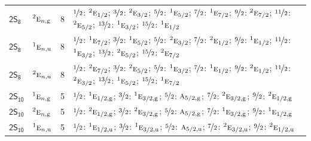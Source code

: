 \documentclass[10pt,a4paper]{article}
\numberwithin{equation}{section}
\newcommand{\grp}[1]{\mathsf{#1}}
\newcommand{\irr}[1]{\text{\normalfont\scshape #1}}
\newcommand{\conjpair}[1]{{}^{#1}}
\newcommand{\ptag}[1]{\mathrm{#1}}
\newlength{\fillwidth}\newlength{\cellwidth}\newlength{\colwidth}
\begin{document}
{\begin{longtable}{@{}llr>{\RaggedRight\arraybackslash}p{\fillwidth}@{}}
\href{2S8.pdf}{$\grp{2S_{8}}$} & $\conjpair{2}\irr{e}_{n,\ptag{g}}$ & 8 & $\nicefrac{1}{2}$: $\conjpair{2}\irr{e}_{1/2}$; $\nicefrac{3}{2}$: $\conjpair{2}\irr{e}_{3/2}$; $\nicefrac{5}{2}$: $\conjpair{1}\irr{e}_{5/2}$; $\nicefrac{7}{2}$: $\conjpair{1}\irr{e}_{7/2}$; $\nicefrac{9}{2}$: $\conjpair{2}\irr{e}_{7/2}$; $\nicefrac{11}{2}$: $\conjpair{2}\irr{e}_{5/2}$; $\nicefrac{13}{2}$: $\conjpair{1}\irr{e}_{3/2}$; $\nicefrac{15}{2}$: $\conjpair{1}\irr{e}_{1/2}$\\
\href{2S8.pdf}{$\grp{2S_{8}}$} & $\conjpair{1}\irr{e}_{n,\ptag{u}}$ & 8 & $\nicefrac{1}{2}$: $\conjpair{1}\irr{e}_{7/2}$; $\nicefrac{3}{2}$: $\conjpair{1}\irr{e}_{5/2}$; $\nicefrac{5}{2}$: $\conjpair{2}\irr{e}_{3/2}$; $\nicefrac{7}{2}$: $\conjpair{2}\irr{e}_{1/2}$; $\nicefrac{9}{2}$: $\conjpair{1}\irr{e}_{1/2}$; $\nicefrac{11}{2}$: $\conjpair{1}\irr{e}_{3/2}$; $\nicefrac{13}{2}$: $\conjpair{2}\irr{e}_{5/2}$; $\nicefrac{15}{2}$: $\conjpair{2}\irr{e}_{7/2}$\\
\href{2S8.pdf}{$\grp{2S_{8}}$} & $\conjpair{2}\irr{e}_{n,\ptag{u}}$ & 8 & $\nicefrac{1}{2}$: $\conjpair{2}\irr{e}_{7/2}$; $\nicefrac{3}{2}$: $\conjpair{2}\irr{e}_{5/2}$; $\nicefrac{5}{2}$: $\conjpair{1}\irr{e}_{3/2}$; $\nicefrac{7}{2}$: $\conjpair{1}\irr{e}_{1/2}$; $\nicefrac{9}{2}$: $\conjpair{2}\irr{e}_{1/2}$; $\nicefrac{11}{2}$: $\conjpair{2}\irr{e}_{3/2}$; $\nicefrac{13}{2}$: $\conjpair{1}\irr{e}_{5/2}$; $\nicefrac{15}{2}$: $\conjpair{1}\irr{e}_{7/2}$\\
\href{2S10.pdf}{$\grp{2S_{10}}$} & $\conjpair{1}\irr{e}_{n,\ptag{g}}$ & 5 & $\nicefrac{1}{2}$: $\conjpair{1}\irr{e}_{1/2,\ptag{g}}$; $\nicefrac{3}{2}$: $\conjpair{1}\irr{e}_{3/2,\ptag{g}}$; $\nicefrac{5}{2}$: $\irr{a}_{5/2,\ptag{g}}$; $\nicefrac{7}{2}$: $\conjpair{2}\irr{e}_{3/2,\ptag{g}}$; $\nicefrac{9}{2}$: $\conjpair{2}\irr{e}_{1/2,\ptag{g}}$\\
\href{2S10.pdf}{$\grp{2S_{10}}$} & $\conjpair{2}\irr{e}_{n,\ptag{g}}$ & 5 & $\nicefrac{1}{2}$: $\conjpair{2}\irr{e}_{1/2,\ptag{g}}$; $\nicefrac{3}{2}$: $\conjpair{2}\irr{e}_{3/2,\ptag{g}}$; $\nicefrac{5}{2}$: $\irr{a}_{5/2,\ptag{g}}$; $\nicefrac{7}{2}$: $\conjpair{1}\irr{e}_{3/2,\ptag{g}}$; $\nicefrac{9}{2}$: $\conjpair{1}\irr{e}_{1/2,\ptag{g}}$\\
\href{2S10.pdf}{$\grp{2S_{10}}$} & $\conjpair{1}\irr{e}_{n,\ptag{u}}$ & 5 & $\nicefrac{1}{2}$: $\conjpair{1}\irr{e}_{1/2,\ptag{u}}$; $\nicefrac{3}{2}$: $\conjpair{1}\irr{e}_{3/2,\ptag{u}}$; $\nicefrac{5}{2}$: $\irr{a}_{5/2,\ptag{u}}$; $\nicefrac{7}{2}$: $\conjpair{2}\irr{e}_{3/2,\ptag{u}}$; $\nicefrac{9}{2}$: $\conjpair{2}\irr{e}_{1/2,\ptag{u}}$\\

\end{longtable}}
\end{document}
